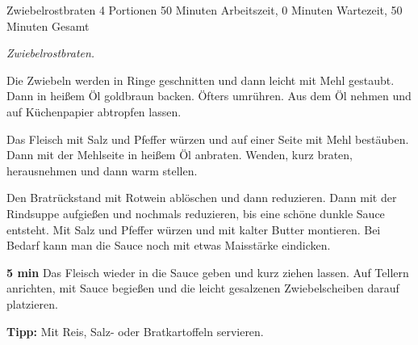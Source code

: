 \begin{recipe}{Zwiebelrostbraten} {4 Portionen} {50 Minuten Arbeitszeit, 0 Minuten Wartezeit, 50 Minuten Gesamt}

  \freeform{}\textit{Zwiebelrostbraten.}


  Die Zwiebeln werden in Ringe geschnitten und dann leicht mit Mehl gestaubt.
  Dann in heißem Öl goldbraun backen.
  Öfters umrühren.
  Aus dem Öl nehmen und auf Küchenpapier abtropfen lassen.


  Das Fleisch mit Salz und Pfeffer würzen und auf einer Seite mit Mehl bestäuben.
  Dann mit der Mehlseite in heißem Öl anbraten.
  Wenden, kurz braten, herausnehmen und dann warm stellen.


  Den Bratrückstand mit Rotwein ablöschen und dann reduzieren.
  Dann mit der Rindsuppe aufgießen und nochmals reduzieren, bis eine schöne dunkle Sauce entsteht.
  Mit Salz und Pfeffer würzen und mit kalter Butter montieren.
  Bei Bedarf kann man die Sauce noch mit etwas Maisstärke eindicken.

  \newstep{}\textbf{5 min}
  Das Fleisch wieder in die Sauce geben und kurz ziehen lassen.
  Auf Tellern anrichten, mit Sauce begießen und die leicht gesalzenen Zwiebelscheiben darauf platzieren.

  \freeform{}\hrulefill{}

  \freeform{}\textbf{Tipp:}
  Mit Reis, Salz- oder Bratkartoffeln servieren.

\end{recipe}
